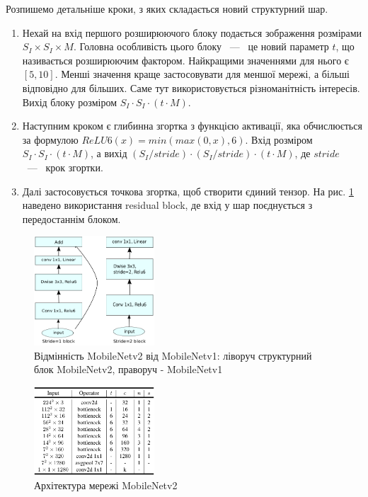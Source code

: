 Розпишемо детальніше кроки, з яких складається новий структурний шар.   
\begin{enumerate}
    \item Нехай на вхід першого розширюючого блоку подається зображення розмірами $S_I \times S_I \times M$.
          Головна особливість цього блоку ~---~ це новий параметр $t$, що називається розширюючим фактором.
          Найкращими значеннями для нього є $[5,10]$. Менші значення краще застосовувати для меншої мережі,
          а більші відповідно для більших. Саме тут використовується різноманітність інтересів.
          Вихід блоку розміром $S_I \cdot  S_I \cdot  (t\cdot M)$.
      \item Наступним кроком є глибинна згортка з функцією активації,
          яка обчислюється за формулою $ReLU6(x) =  min(max(0,x),6)$.
          Вхід розміром $S_I \cdot  S_I \cdot  (t\cdot M)$, а вихід $(S_I/stride) \cdot  (S_I/stride) \cdot  (t\cdot M)$, 
          де  $stride$ ~---~ крок згортки.
    \item Далі застосовується точкова згортка, щоб створити єдиний тензор. На 
          рис. \ref{fig:cnn:mobilenetv2_layer} наведено використання residual block, де вхід у шар
          поєднується з передостаннім блоком.
\end{enumerate}
\begin{figure}[H]
    \centering
    \includegraphics[width=0.4\textwidth]{images/cnn_mobilenetv2_layer}
    \caption{Відмінність MobileNetv2 від MobileNetv1: ліворуч структурний блок MobileNetv2,
        праворуч - MobileNetv1   \cite{mobilenetv2}
        \label{fig:cnn:mobilenetv2_layer}
    }
\end{figure}

\begin{figure}[H]
    \centering
    \includegraphics[width=0.4\textwidth]{images/cnn_mobilenetv2_architecture}
    \caption{Архітектура мережі MobileNetv2     \cite{mobilenetv2}
        \label{fig:cnn:mobilenetv2_architecture}
    }
\end{figure}

